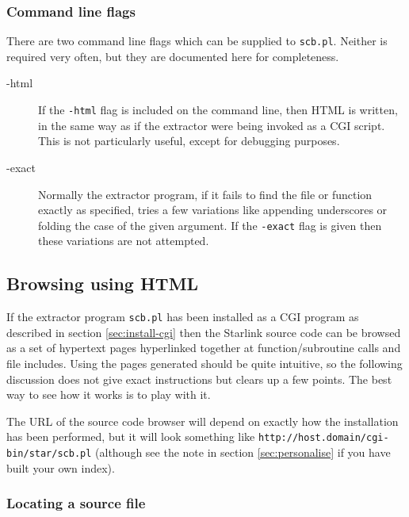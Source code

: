 \documentclass[twoside,11pt]{article}
\newcommand{\xlabel}[1]{}
\renewcommand{\_}{\texttt{\symbol{95}}}
\begin{document}
\subsubsection{\xlabel{sec:extract-flags}\label{sec:extract-flags}Command line flags}

There are two command line flags which can be supplied to {\tt scb.pl}.
Neither is required very often, but they are documented here for completeness.
\begin{description}
\item[-html]
If the {\tt -html} flag is included on the command line, 
then HTML is written, in the same way as if the extractor were
being invoked as a CGI script.  This is not particularly useful,
except for debugging purposes.
\item[-exact]
Normally the extractor program, if it fails to find the file or
function exactly as specified, tries a few variations like appending
underscores or folding the case of the given argument.
If the {\tt -exact} flag is given then these variations are not attempted.
\end{description}




\subsection{\xlabel{sec:extract-cgi}\label{sec:extract-cgi}Browsing using HTML}

If the extractor program {\tt scb.pl} has been installed
as a CGI program as described in section \ref{sec:install-cgi}
then the Starlink source code can be browsed as a set of 
hypertext pages hyperlinked together 
at function/subroutine calls and file includes.
Using the pages generated should be quite intuitive,
so the following discussion does not give exact instructions
but clears up a few points.
The best way to see how it works is to play with it.

The URL of the source code browser will depend on exactly how
the installation has been performed, but it will look something
like {\tt http://host.domain/cgi-bin/star/scb.pl} 
(although see the note in section \ref{sec:personalise} 
if you have built your own index).


\subsubsection{\xlabel{BROWSER-HELP}\label{BROWSER-HELP}Locating a source file}
\end{document}
